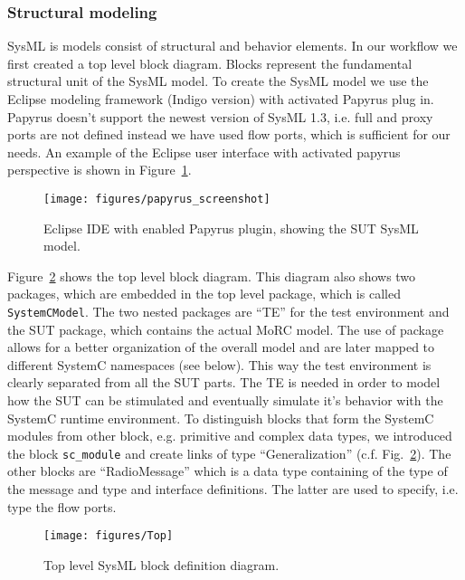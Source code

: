 \documentclass{template/openetcs_article}
\begin{document}
\subsubsection{Structural modeling}

SysML is models consist of structural and behavior elements. In our workflow we first created a top level block diagram. Blocks represent the fundamental structural unit of the SysML model. To create the SysML model we use the Eclipse modeling framework (Indigo version) with activated Papyrus plug in. Papyrus doesn't support the newest version of SysML 1.3, i.e. full and proxy ports are not defined instead we have used flow ports, which is sufficient for our needs. An example of the Eclipse user interface with activated papyrus perspective is shown in Figure~\ref{fig:eclipseIDE}.

\begin{figure}
\begin{center}
\texttt{[image: figures/papyrus\_screenshot]}
\end{center}
\caption{Eclipse IDE with enabled Papyrus plugin, showing the SUT SysML model.}
\label{fig:eclipseIDE}
\end{figure}

Figure~\ref{fig:sysmlToplevel} shows the top level block diagram. This diagram also shows two packages, which are embedded in the top level package, which is called \verb|SystemCModel|. The two nested packages are "`TE"' for the test environment and the SUT package, which contains the actual MoRC model. The use of package allows for a better organization of the overall model and are later mapped to different SystemC namespaces (see below). This way the test environment is clearly separated from all the SUT parts. The TE is needed in order to model how the SUT can be stimulated and eventually simulate it's behavior with the SystemC runtime environment. To distinguish blocks that form the SystemC modules from other block, e.g. primitive and complex data types, we introduced the block  \verb|sc_module| and create links of type "`Generalization"' (c.f. Fig.~\ref{fig:sysmlToplevel}). The other blocks are "`RadioMessage"' which is a data type containing of the type of the message and type and interface definitions. The latter are used to specify, i.e. type the flow ports. 

\begin{figure}
\begin{center}
\texttt{[image: figures/Top]}
\end{center}
\caption{Top level SysML block definition diagram.}
\label{fig:sysmlToplevel}
\end{figure}
\end{document}

